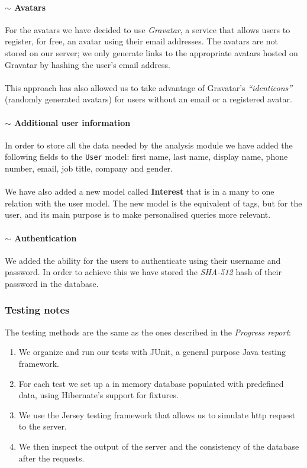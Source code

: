 \documentclass[12p, a4paper, onecolumn]{report}
\begin{document}
\paragraph{$\sim$ Avatars}

For the avatars we have decided to use \emph{Gravatar}, a service that allows users to register, for free, an avatar using their email addresses. The avatars are not stored on our server; we only generate links to the appropriate avatars hosted on Gravatar by hashing the user's email address. \\ \\
This approach has also allowed us to take advantage of  Gravatar’s \emph{“identicons”} (randomly generated avatars) for users without an email or a registered avatar.

\paragraph{$\sim$ Additional user information}

In order to store all the data needed by the analysis module we have added the following fields to the \texttt{User} model: first name, last name, display name, phone number, email, job title, company and gender. \\ \\
We have also added a new model called \textbf{Interest} that is in a many to one relation with the user model. The new model is the equivalent of tags, but for the user, and its main purpose is to make personalised queries more relevant.

\paragraph{$\sim$ Authentication}

We added the ability for the users to authenticate using their username and password. In order to achieve this we have stored the \emph{SHA-512} hash of their password in the database. 

\subsubsection{Testing notes}

The testing methods are the same as the ones described in the \emph{Progress report}:
\begin{enumerate} 
	\item We organize and run our tests with JUnit, a general purpose Java testing framework. 
	\item For each test we set up a in memory database populated with  predefined data, using Hibernate’s support for fixtures.
	\item We use the Jersey testing framework that allows us to simulate http request to the server. 
	\item We then inspect the output of the server and the consistency of the database after the requests.
\end{enumerate}
\end{document}
